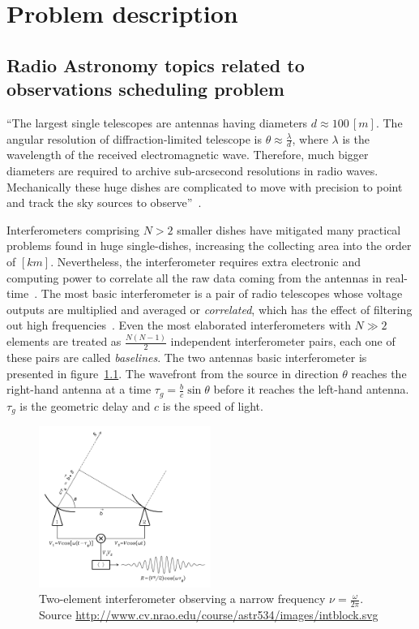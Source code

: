 \chapter{Problem description}
\section{Radio Astronomy topics related to observations scheduling problem}

``The largest single telescopes are antennas having diameters $d\approx 100\,[m]$. The angular resolution of diffraction-limited telescope is $\theta \approx \frac{\lambda}{d}$, where $\lambda$ is the wavelength of the received electromagnetic wave. Therefore, much bigger diameters are required to archive sub-arcsecond resolutions in radio waves. Mechanically these huge dishes are complicated to move with precision to point and track the sky sources to observe''~\cite{condon10}.

Interferometers comprising $N > 2$ smaller dishes have mitigated many practical problems found in huge single-dishes, increasing the collecting area into the order of $[km]$. Nevertheless, the interferometer requires extra electronic and computing power to correlate all the raw data coming from the antennas in real-time~\cite{condon10}.
The most basic interferometer is a pair of radio telescopes whose voltage outputs are multiplied and averaged or \textit{correlated}, which has the effect of filtering out high frequencies~\cite{thompson01}. Even the most elaborated interferometers with $N\gg2$ elements are treated as $\frac{N(N-1)}{2}$ independent interferometer pairs, each one of these pairs are called \textit{baselines}. The two antennas basic interferometer is presented in figure~\ref{fig:interferometer}. The wavefront from the source in direction $\theta$ reaches the right-hand antenna at a time $\tau_g = \frac{b}{c}\sin\theta$ before it reaches the left-hand antenna. $\tau_g$ is the geometric delay and $c$ is the speed of light.

\begin{figure}[htbp]
\centering
\includegraphics[width=0.5\textwidth]{images/intblock}
\caption[Two-element interferometer observing a narrow frequency $\nu=\frac{\omega}{2\pi}$]{Two-element interferometer observing a narrow frequency $\nu=\frac{\omega}{2\pi}$. Source \url{http://www.cv.nrao.edu/course/astr534/images/intblock.svg}}
\label{fig:interferometer}
\end{figure}


